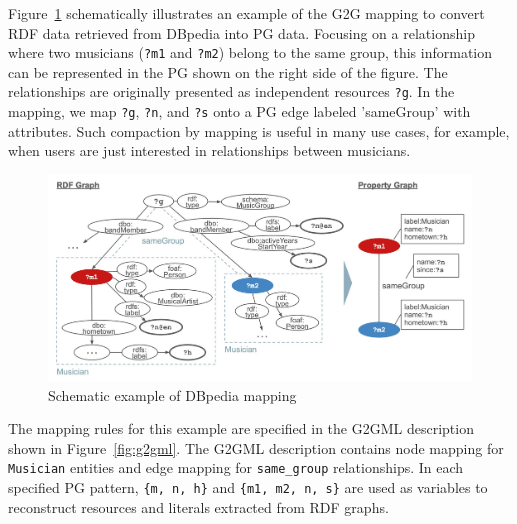 \documentclass[runningheads]{llncs}
\begin{document}
Figure~\ref{fig:conversion} schematically illustrates an example of the G2G mapping to convert RDF data retrieved from DBpedia into PG data. 
Focusing on a relationship where two musicians (\texttt{?m1} and \texttt{?m2}) belong to the same group, this information can be represented in the PG shown on the right side of the figure. The relationships are originally presented as independent resources \texttt{?g}. In the mapping, we map \texttt{?g}, \texttt{?n}, and \texttt{?s} onto a PG edge labeled 'sameGroup' with attributes. Such compaction by mapping is useful in many use cases, for example, when users are just interested in relationships between musicians.
 
\begin{figure}
\center
\includegraphics[width=1.0\textwidth]{example.jpg}
\caption{Schematic example of DBpedia mapping}
\label{fig:conversion}
\end{figure}
 
The mapping rules for this example are specified in the G2GML description shown in Figure~\ref{fig:g2gml}. The G2GML description contains node mapping for \texttt{Musician} entities and edge mapping for \texttt{same\_group} relationships.
In each specified PG pattern, \texttt{\{m, n, h\}} and \texttt{\{m1, m2, n, s\}} are used as variables to reconstruct resources and literals extracted from RDF graphs. 
 
\end{document}
